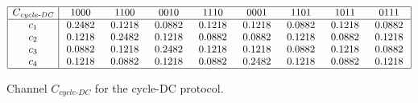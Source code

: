 %
\begin{table}[htb]
\centering
\begin{subtable}[b]{\linewidth}
\centering
$
\begin{array}{|c|c c c c c c c c|}
    \hline
    C_\textit{cycle-DC}   & \,\,\,\,1000\,\,\,\, & \,\,\,\,1100\,\,\,\, & \,\,\,\,0010\,\,\,\, & \,\,\,\,1110\,\,\,\, & \,\,\,\,0001\,\,\,\, & \,\,\,\,1101\,\,\,\, & \,\,\,\,1011\,\,\,\, & \,\,\,\,0111\,\,\,\,  \\
    \hline 
    c_{1} & 0.2482 & 0.1218 & 0.0882 & 0.1218 & 0.1218 & 0.0882 & 0.1218 & 0.0882 \\
    c_{2} & 0.1218 & 0.2482 & 0.1218 & 0.0882 & 0.0882 & 0.1218 & 0.0882 & 0.1218 \\
    c_{3} & 0.0882 & 0.1218 & 0.2482 & 0.1218 & 0.1218 & 0.0882 & 0.1218 & 0.0882 \\
    c_{4} & 0.1218 & 0.0882 & 0.1218 & 0.0882 & 0.2482 & 0.1218 & 0.0882 & 0.1218 \\ 
    \hline
\end{array}
$
\caption{Channel $C_\textit{cycle-DC}$ for the cycle-DC protocol.}
\end{subtable}
\hfill
{}
\end{table}
